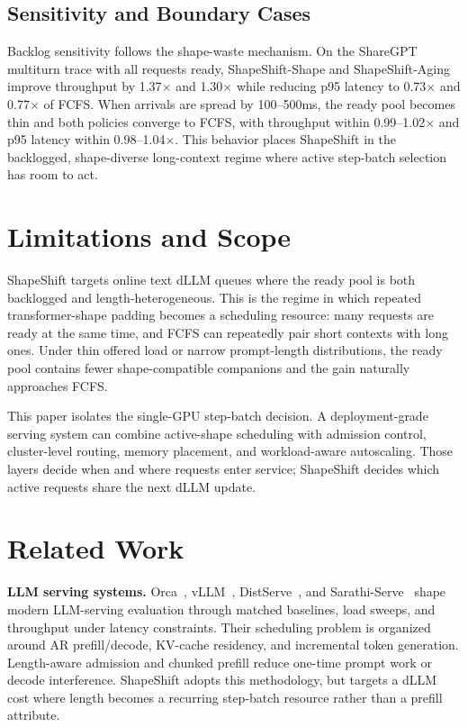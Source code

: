 \documentclass[letterpaper]{article} \usepackage[submission]{aaai2027} \usepackage[hyphens]{url} \usepackage{graphicx} \usepackage{subcaption} \urlstyle{rm} \def\UrlFont{\rm} \usepackage{natbib} \usepackage{amsmath} \usepackage{amssymb} \usepackage{booktabs} \usepackage{multirow} \usepackage{algorithm} \usepackage{algorithmic}
\begin{document}
\subsection{Sensitivity and Boundary Cases}

Backlog sensitivity follows the shape-waste mechanism. On the ShareGPT multiturn trace with all requests ready, ShapeShift-Shape and ShapeShift-Aging improve throughput by 1.37$\times$ and 1.30$\times$ while reducing p95 latency to 0.73$\times$ and 0.77$\times$ of FCFS. When arrivals are spread by 100--500ms, the ready pool becomes thin and both policies converge to FCFS, with throughput within 0.99--1.02$\times$ and p95 latency within 0.98--1.04$\times$. This behavior places ShapeShift in the backlogged, shape-diverse long-context regime where active step-batch selection has room to act.

\section{Limitations and Scope}

ShapeShift targets online text dLLM queues where the ready pool is both backlogged and length-heterogeneous. This is the regime in which repeated transformer-shape padding becomes a scheduling resource: many requests are ready at the same time, and FCFS can repeatedly pair short contexts with long ones. Under thin offered load or narrow prompt-length distributions, the ready pool contains fewer shape-compatible companions and the gain naturally approaches FCFS.

This paper isolates the single-GPU step-batch decision. A deployment-grade serving system can combine active-shape scheduling with admission control, cluster-level routing, memory placement, and workload-aware autoscaling. Those layers decide when and where requests enter service; ShapeShift decides which active requests share the next dLLM update.

\section{Related Work}

\textbf{LLM serving systems.} Orca~\cite{orca2022}, vLLM~\cite{vllm2023}, DistServe~\cite{distserve2024}, and Sarathi-Serve~\cite{sarathi2024} shape modern LLM-serving evaluation through matched baselines, load sweeps, and throughput under latency constraints. Their scheduling problem is organized around AR prefill/decode, KV-cache residency, and incremental token generation. Length-aware admission and chunked prefill reduce one-time prompt work or decode interference. ShapeShift adopts this methodology, but targets a dLLM cost where length becomes a recurring step-batch resource rather than a prefill attribute.
\end{document}
